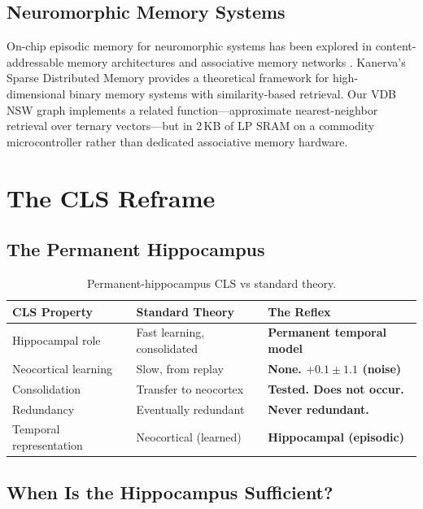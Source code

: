 \documentclass[11pt,letterpaper]{article}
\begin{document}
\subsection{Neuromorphic Memory Systems}

On-chip episodic memory for neuromorphic systems has been explored in content-addressable memory architectures \cite{kanerva1988sparse} and associative memory networks \cite{hopfield1982neural}. Kanerva's Sparse Distributed Memory provides a theoretical framework for high-dimensional binary memory systems with similarity-based retrieval. Our VDB NSW graph implements a related function---approximate nearest-neighbor retrieval over ternary vectors---but in 2\,KB of LP SRAM on a commodity microcontroller rather than dedicated associative memory hardware.

\section{The CLS Reframe}

\subsection{The Permanent Hippocampus}

\begin{table}[h]
\centering
\small
\begin{tabular}{lll}
\toprule
CLS Property & Standard Theory & The Reflex \\
\midrule
Hippocampal role & Fast learning, consolidated & \textbf{Permanent temporal model} \\
Neocortical learning & Slow, from replay & \textbf{None. $+0.1 \pm 1.1$ (noise)} \\
Consolidation & Transfer to neocortex & \textbf{Tested. Does not occur.} \\
Redundancy & Eventually redundant & \textbf{Never redundant.} \\
Temporal representation & Neocortical (learned) & \textbf{Hippocampal (episodic)} \\
\bottomrule
\end{tabular}
\caption{Permanent-hippocampus CLS vs standard theory.}
\end{table}

\subsection{When Is the Hippocampus Sufficient?}
\label{sec:sufficiency}
\end{document}
